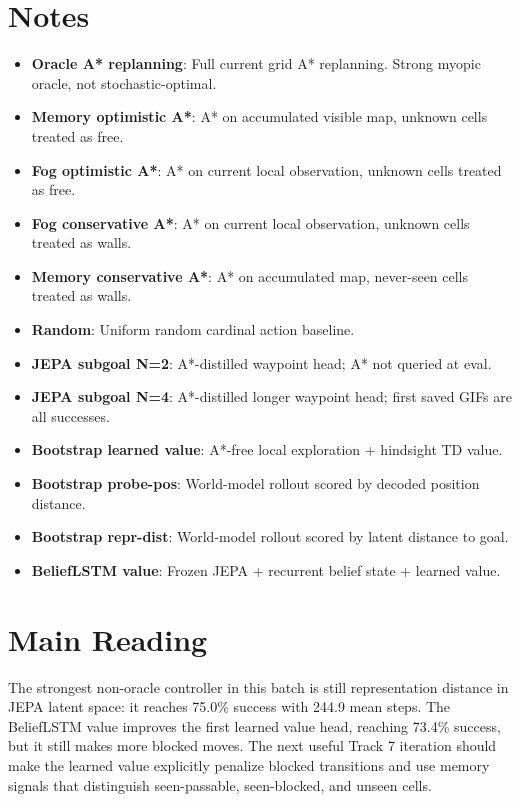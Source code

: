 \documentclass[10pt]{article}
\begin{document}
\section*{Notes}
\begin{itemize}
\item \textbf{Oracle A* replanning}: Full current grid A* replanning. Strong myopic oracle, not stochastic-optimal.
\item \textbf{Memory optimistic A*}: A* on accumulated visible map, unknown cells treated as free.
\item \textbf{Fog optimistic A*}: A* on current local observation, unknown cells treated as free.
\item \textbf{Fog conservative A*}: A* on current local observation, unknown cells treated as walls.
\item \textbf{Memory conservative A*}: A* on accumulated map, never-seen cells treated as walls.
\item \textbf{Random}: Uniform random cardinal action baseline.
\item \textbf{JEPA subgoal N=2}: A*-distilled waypoint head; A* not queried at eval.
\item \textbf{JEPA subgoal N=4}: A*-distilled longer waypoint head; first saved GIFs are all successes.
\item \textbf{Bootstrap learned value}: A*-free local exploration + hindsight TD value.
\item \textbf{Bootstrap probe-pos}: World-model rollout scored by decoded position distance.
\item \textbf{Bootstrap repr-dist}: World-model rollout scored by latent distance to goal.
\item \textbf{BeliefLSTM value}: Frozen JEPA + recurrent belief state + learned value.
\end{itemize}

\section*{Main Reading}
The strongest non-oracle controller in this batch is still representation
distance in JEPA latent space: it reaches 75.0\% success with 244.9 mean steps.
The BeliefLSTM value improves the first learned value head, reaching 73.4\%
success, but it still makes more blocked moves. The next useful Track 7
iteration should make the learned value explicitly penalize blocked transitions
and use memory signals that distinguish seen-passable, seen-blocked, and
unseen cells.
\end{document}
